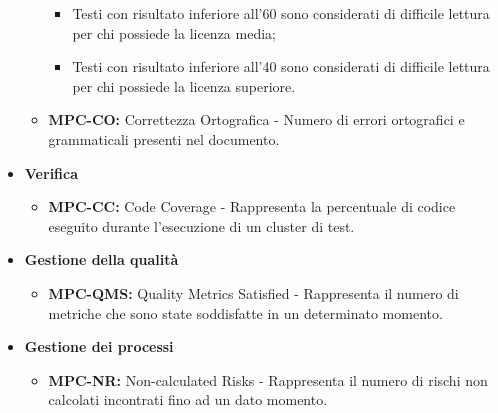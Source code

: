 \documentclass[8pt]{article}
\begin{document}
\begin{itemize}
\begin{itemize}
\begin{itemize}
                    \item Testi con risultato inferiore all'60 sono considerati di difficile lettura per chi possiede la licenza media;
                    \item Testi con risultato inferiore all'40 sono considerati di difficile lettura per chi possiede la licenza superiore.
                \end{itemize}
            \item \textbf{MPC-CO:} Correttezza Ortografica - Numero di errori ortografici e grammaticali presenti nel documento.
        \end{itemize}
    \item \textbf{Verifica}
        \begin{itemize}
            \item \textbf{MPC-CC:} Code Coverage - Rappresenta la percentuale di codice eseguito durante l'esecuzione di un cluster di test.
        \end{itemize}
    \item \textbf{Gestione della qualità}
        \begin{itemize}
            \item \textbf{MPC-QMS:} Quality Metrics Satisfied - Rappresenta il numero di metriche che sono state soddisfatte in un determinato momento.
        \end{itemize}
    \item \textbf{Gestione dei processi}
        \begin{itemize}
            \item \textbf{MPC-NR:} Non-calculated Risks - Rappresenta il numero di rischi non calcolati incontrati fino ad un dato momento.
        \end{itemize}
\end{itemize}
\end{document}
